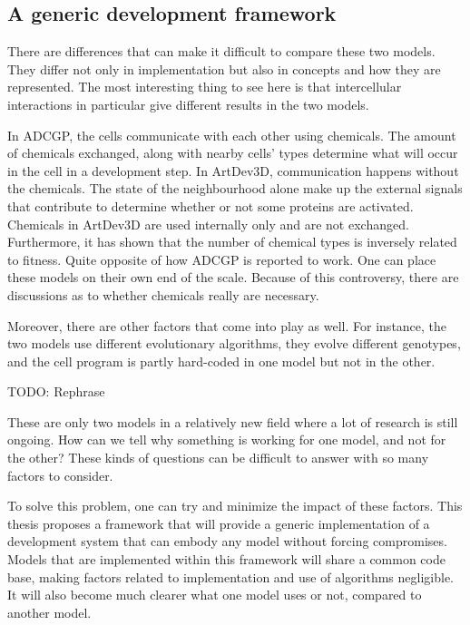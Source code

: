 \subsection{A generic development framework}
\label{sec:framework_requirements}
There are differences that can make it difficult to compare these two models. They differ not only in implementation but also in concepts and how they are represented. The most interesting thing to see here is that intercellular interactions in particular give different results in the two models.

In ADCGP, the cells communicate with each other using chemicals. The amount of chemicals exchanged, along with nearby cells' types determine what will occur in the cell in a development step. In ArtDev3D, communication happens without the chemicals. The state of the neighbourhood alone make up the external signals that contribute to determine whether or not some proteins are activated. Chemicals in ArtDev3D are used internally only and are not exchanged. Furthermore, it has shown that the number of chemical types is inversely related to fitness. Quite opposite of how ADCGP is reported to work. One can place these models on their own end of the scale. Because of this controversy, there are discussions as to whether chemicals really are necessary.

Moreover, there are other factors that come into play as well. For instance, the two models use different evolutionary algorithms, they evolve different genotypes, and the cell program is partly hard-coded in one model but not in the other.

TODO:
Rephrase

These are only two models in a relatively new field where a lot of research is still ongoing. How can we tell why something is working for one model, and not for the other? These kinds of questions can be difficult to answer with so many factors to consider.

To solve this problem, one can try and minimize the impact of these factors. This thesis proposes a framework that will provide a generic implementation of a development system that can embody any model without forcing compromises. Models that are implemented within this framework will share a common code base, making factors related to implementation and use of algorithms negligible. It will also become much clearer what one model uses or not, compared to another model.

